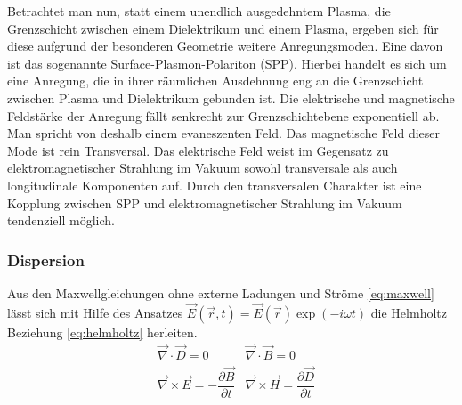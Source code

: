 \documentclass{article}
\begin{document}
	Betrachtet man nun, statt einem unendlich ausgedehntem Plasma, die Grenzschicht zwischen einem Dielektrikum und einem Plasma, ergeben sich für diese aufgrund der besonderen Geometrie weitere Anregungsmoden. Eine davon ist das sogenannte Surface-Plasmon-Polariton (SPP). Hierbei handelt es sich um eine Anregung, die in ihrer räumlichen Ausdehnung eng an die Grenzschicht zwischen Plasma und Dielektrikum gebunden ist. Die elektrische und magnetische Feldstärke der Anregung fällt senkrecht zur Grenzschichtebene exponentiell ab. Man spricht von deshalb einem evaneszenten Feld. Das magnetische Feld dieser Mode ist rein Transversal. Das elektrische Feld weist im Gegensatz zu elektromagnetischer Strahlung im Vakuum sowohl transversale als auch longitudinale Komponenten auf. Durch den transversalen Charakter ist eine Kopplung zwischen SPP und elektromagnetischer Strahlung im Vakuum tendenziell möglich.

	\subsubsection{Dispersion}
	Aus den Maxwellgleichungen ohne externe Ladungen und Ströme \eqref{eq:maxwell} lässt sich mit Hilfe des Ansatzes $\vec{E}\left(\vec{r},t\right) = \vec{E}\left(\vec{r}\right) \exp\left(-i\omega t\right)$ die Helmholtz Beziehung \eqref{eq:helmholtz} herleiten.
	\begin{align}
		\label{eq:maxwell}	
		&\vec{\nabla}\cdot\vec{D} = 0		&\vec{\nabla}\cdot\vec{B} = 0 \\
		&\vec{\nabla}\times\vec{E} = -\dfrac{\partial\vec{B}}{\partial t} 
		&\vec{\nabla}\times\vec{H} = 	\dfrac{\partial\vec{D}}{\partial t}\nonumber
	\end{align}
\end{document}
